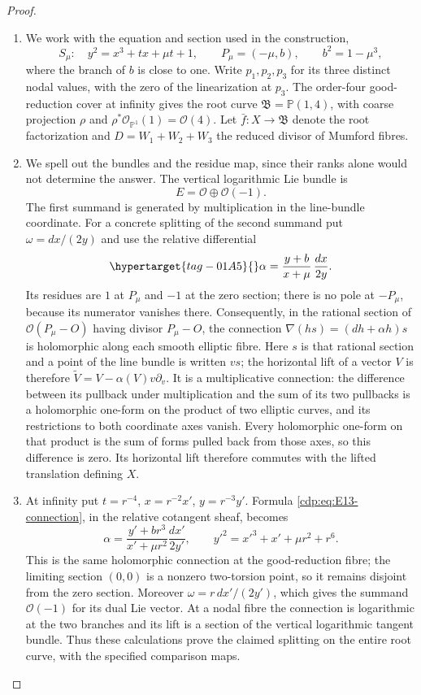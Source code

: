 \begin{proof}

\begin{enumerate}[label={$\langle1\rangle$\arabic*.},leftmargin=*]
\item We work with the equation and section used in the construction,
\[
 S_\mu:\quad y^2=x^3+tx+\mu t+1,\qquad
 P_\mu=(-\mu,b),\qquad b^2=1-\mu^3,
\]
where the branch of $b$ is close to one. Write $p_1,p_2,p_3$ for its
three distinct nodal values, with the zero of the linearization at
$p_3$. The order-four good-reduction cover at infinity gives the
root curve $\mathfrak B=\mathbb P(1,4)$, with coarse projection
$\rho$ and $\rho^*\mathcal O_{\mathbb P^1}(1)=\mathcal O(4)$.
Let $\bar f:X\to\mathfrak B$ denote the root factorization and
$D=W_1+W_2+W_3$ the reduced divisor of Mumford fibres.

\item We spell out the bundles and the residue map, since their ranks alone
would not determine the answer. The vertical logarithmic Lie bundle
is
\[
 E=\mathcal O\oplus\mathcal O(-1).
\]
The first summand is generated by multiplication in the line-bundle
coordinate. For a concrete splitting of the second summand put
$\omega=dx/(2y)$ and use the relative differential
\begin{equation}\hypertarget{tag-01A5}{}\label{cdp:eq:E13-connection}
 \alpha=\frac{y+b}{x+\mu}\,\frac{dx}{2y}.
\end{equation}
Its residues are $1$ at $P_\mu$ and $-1$ at the zero section; there
is no pole at $-P_\mu$, because its numerator vanishes there.
Consequently, in the rational section of
$\mathcal O(P_\mu-O)$ having divisor $P_\mu-O$, the connection
$\nabla(hs)=(dh+\alpha h)s$ is holomorphic along each smooth
elliptic fibre. Here $s$ is that rational section and a point of
the line bundle is written $v s$; the horizontal lift of a vector
$V$ is therefore $\widetilde V=V-\alpha(V)v\partial_v$.
It is a multiplicative connection: the difference between its
pullback under multiplication and the sum of its two pullbacks is a
holomorphic one-form on the product of two elliptic curves, and its
restrictions to both coordinate axes vanish. Every holomorphic
one-form on that product is the sum of forms pulled back from those
axes, so this difference is zero. Its horizontal lift therefore
commutes with the lifted translation defining $X$.

\item At infinity put $t=r^{-4}$, $x=r^{-2}x'$, $y=r^{-3}y'$. Formula
\eqref{cdp:eq:E13-connection}, in the relative cotangent sheaf, becomes
\[
 \alpha=\frac{y'+br^3}{x'+\mu r^2}\frac{dx'}{2y'},
 \qquad y'^2=x'^3+x'+\mu r^2+r^6.
\]
This is the same holomorphic connection at the good-reduction
fibre; the limiting section $(0,0)$ is a nonzero two-torsion point,
so it remains disjoint from the zero section. Moreover
$\omega=r\,dx'/(2y')$, which gives the summand $\mathcal O(-1)$
for its dual Lie vector. At a nodal fibre the connection is
logarithmic at the two branches and its lift is a section of the
vertical logarithmic tangent bundle. Thus these calculations prove
the claimed splitting on the entire root curve, with the specified
comparison maps.


\end{enumerate}
\end{proof}
